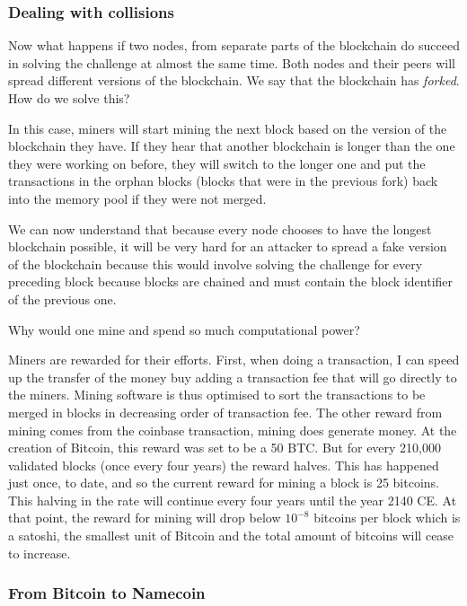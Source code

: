 \documentclass{vldb}
\begin{document}
\subsubsection{Dealing with collisions}

Now what happens if two nodes, from separate parts of the blockchain do succeed in solving the challenge at almost the same time. Both nodes and their peers will spread different versions of the blockchain. We say that the blockchain has \emph{forked}. How do we solve this?

In this case, miners will start mining the next block based on the version of the blockchain they have. If they hear that another blockchain is longer than the one they were working on before, they will switch to the longer one and put the transactions in the orphan blocks (blocks that were in the previous fork) back into the memory pool if they were not merged. 

We can now understand that because every node chooses to have the longest blockchain possible, it will be very hard for an attacker to spread a fake version of the blockchain because this would involve solving the challenge for every preceding block because blocks are chained and must contain the block identifier of the previous one. 

Why would one mine and spend so much computational power?

Miners are rewarded for their efforts. First, when doing a transaction, I can speed up the transfer of the money buy adding a transaction fee that will go directly to the miners. Mining software is thus optimised to sort the transactions to be merged in blocks in decreasing order of transaction fee. 
The other reward from mining comes from the coinbase transaction, mining does generate money.  At the creation of Bitcoin, this reward was set to be a 50 BTC. But for every 210,000 validated blocks (once every four years) the reward halves. This has happened just once, to date, and so the current reward for mining a block is 25 bitcoins. This halving in the rate will continue every four years until the year 2140 CE. At that point, the reward for mining will drop below $10^{-8}$ bitcoins per block which is a satoshi, the smallest unit of Bitcoin and the total amount of bitcoins will cease to increase.

\subsubsection{From Bitcoin to Namecoin}
\end{document}
